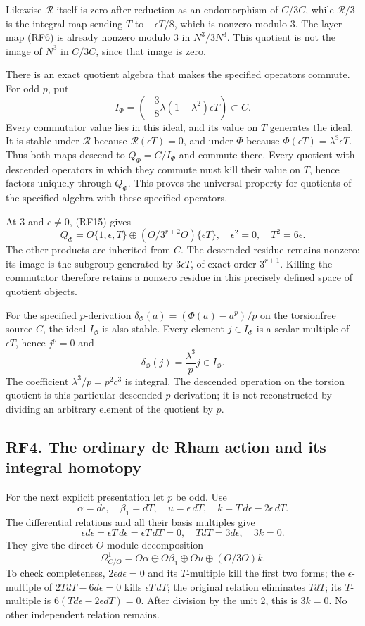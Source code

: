 \documentclass[
]{article}
\begin{document}
Likewise \(\mathcal R\) itself is zero after reduction as an
endomorphism of \(C/3C\), while \(\mathcal R/3\) is the integral map
sending \(T\) to \(-\epsilon T/8\), which is nonzero modulo 3. The layer
map (RF6) is already nonzero modulo 3 in \(N^3/3N^3\). This quotient is
not the image of \(N^3\) in \(C/3C\), since that image is zero.

There is an exact quotient algebra that makes the specified operators
commute. For odd \(p\), put \[
I_\Phi=\left(-\frac38\lambda(1-\lambda^2)\epsilon T\right)\subset C.
\tag{RF17}
\] Every commutator value lies in this ideal, and its value on \(T\)
generates the ideal. It is stable under \(\mathcal R\) because
\(\mathcal R(\epsilon T)=0\), and under \(\Phi\) because
\(\Phi(\epsilon T)=\lambda^3\epsilon T\). Thus both maps descend to
\(Q_\Phi=C/I_\Phi\) and commute there. Every quotient with descended
operators in which they commute must kill their value on \(T\), hence
factors uniquely through \(Q_\Phi\). This proves the universal property
for quotients of the specified algebra with these specified operators.

At 3 and \(c\ne0\), (RF15) gives \[
Q_\Phi=
O\{1,\epsilon,T\}\oplus(O/3^{r+2}O)\{\epsilon T\},
\quad \epsilon^2=0,\quad T^2=6\epsilon.
\tag{RF18}
\] The other products are inherited from \(C\). The descended residue
remains nonzero: its image is the subgroup generated by \(3\epsilon T\),
of exact order \(3^{r+1}\). Killing the commutator therefore retains a
nonzero residue in this precisely defined space of quotient objects.

For the specified \(p\)-derivation \(\delta_\Phi(a)=(\Phi(a)-a^p)/p\) on
the torsionfree source \(C\), the ideal \(I_\Phi\) is also stable. Every
element \(j\in I_\Phi\) is a scalar multiple of \(\epsilon T\), hence
\(j^p=0\) and \[
\delta_\Phi(j)=\frac{\lambda^3}{p}j\in I_\Phi.
\] The coefficient \(\lambda^3/p=p^2c^3\) is integral. The descended
operation on the torsion quotient is this particular descended
\(p\)-derivation; it is not reconstructed by dividing an arbitrary
element of the quotient by \(p\).

\subsection{RF4. The ordinary de Rham action and its integral
homotopy}\label{rf4.-the-ordinary-de-rham-action-and-its-integral-homotopy}

For the next explicit presentation let \(p\) be odd. Use \[
\alpha=d\epsilon,\quad \beta_1=dT,\quad
u=\epsilon\,dT,\quad
k=T\,d\epsilon-2\epsilon\,dT.
\] The differential relations and all their basis multiples give \[
\epsilon d\epsilon=\epsilon T\,d\epsilon=\epsilon T\,dT=0,
\quad TdT=3d\epsilon,\quad3k=0.
\] They give the direct \(O\)-module decomposition \[
\Omega^1_{C/O}=O\alpha\oplus O\beta_1\oplus Ou\oplus(O/3O)k.
\tag{RF19}
\] To check completeness, \(2\epsilon d\epsilon=0\) and its
\(T\)-multiple kill the first two forms; the \(\epsilon\)-multiple of
\(2TdT-6d\epsilon=0\) kills \(\epsilon T\,dT\); the original relation
eliminates \(TdT\); its \(T\)-multiple is
\(6(Td\epsilon-2\epsilon dT)=0\). After division by the unit 2, this is
\(3k=0\). No other independent relation remains.
\end{document}
